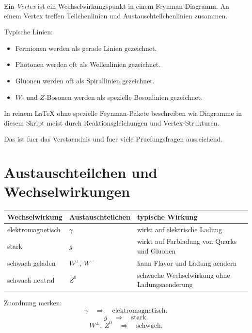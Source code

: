 \begin{definitionbox}
Ein \emph{Vertex} ist ein Wechselwirkungspunkt in einem Feynman-Diagramm.
An einem Vertex treffen Teilchenlinien und Austauschteilchenlinien zusammen.
\end{definitionbox}

\begin{conceptbox}
Typische Linien:
\begin{itemize}
    \item Fermionen werden als gerade Linien gezeichnet.
    \item Photonen werden oft als Wellenlinien gezeichnet.
    \item Gluonen werden oft als Spirallinien gezeichnet.
    \item $W$- und $Z$-Bosonen werden als spezielle Bosonlinien gezeichnet.
\end{itemize}
\end{conceptbox}

\begin{notebox}
In reinem LaTeX ohne spezielle Feynman-Pakete beschreiben wir Diagramme in diesem
Skript meist durch Reaktionsgleichungen und Vertex-Strukturen.

Das ist fuer das Verstaendnis und fuer viele Pruefungsfragen ausreichend.
\end{notebox}

\section{Austauschteilchen und Wechselwirkungen}

\begin{center}
\begin{tabular}{|p{4.0cm}|p{4.0cm}|p{5.2cm}|}
\hline
Wechselwirkung & Austauschteilchen & typische Wirkung \\
\hline
elektromagnetisch & $\gamma$ & wirkt auf elektrische Ladung \\
\hline
stark & $g$ & wirkt auf Farbladung von Quarks und Gluonen \\
\hline
schwach geladen & $W^+$, $W^-$ & kann Flavor und Ladung aendern \\
\hline
schwach neutral & $Z^0$ & schwache Wechselwirkung ohne Ladungsaenderung \\
\hline
\end{tabular}
\end{center}

\begin{examtipbox}
Zuordnung merken:
\[
    \gamma
    \quad\Rightarrow\quad
    \text{elektromagnetisch}.
\]
\[
    g
    \quad\Rightarrow\quad
    \text{stark}.
\]
\[
    W^\pm,\;Z^0
    \quad\Rightarrow\quad
    \text{schwach}.
\]
\end{examtipbox}


